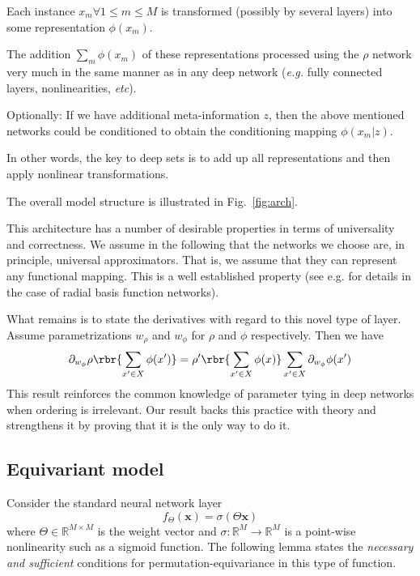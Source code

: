 \documentclass{article}
\newcommand{\reffig}[1]{Fig.~\ref{#1}}
\newcommand{\xx}[0]{\ensuremath{\mathbf{x}}}
\newcommand{\latinphrase}[1]{\emph{#1}}    %
\newcommand{\eg}{\latinphrase{e.g.}\xspace}
\newcommand{\etc}{\latinphrase{etc}\xspace}
\begin{document}
\begin{itemize*}
\item Each instance $x_m \forall 1\leq m \leq M$ is transformed (possibly by several layers) into
  some representation $\phi(x_m)$.
\item The addition $\sum_m \phi(x_m)$ of these representations 
  processed using the $\rho$ network very much in the same manner as in any deep network (\eg
  fully connected layers, nonlinearities, \etc). 
\item Optionally: If we have additional meta-information $z$, then the above mentioned networks could be conditioned to obtain the conditioning mapping $\phi(x_m|z)$. 
\end{itemize*}

In other words, the key to deep sets is to add up all representations and then apply nonlinear transformations. 

The overall model structure is illustrated in \reffig{fig:arch}.

This architecture has a number of desirable properties in terms of universality and correctness. We assume in the following that the networks we choose are, in principle, universal approximators. That is, we assume that they can represent any functional mapping. This is a well established property (see e.g. \cite{Micchelli86b} for details in the case of radial basis function networks).

What remains is to state the derivatives with regard to this novel type of layer. Assume parametrizations $w_\rho$ and $w_\phi$ for $\rho$ and $\phi$ respectively. Then we have
\begin{equation*}
  \partial_{w_\phi} \rho\rbr{\sum_{x' \in X} \phi(x')} = 
  \rho'\rbr{\sum_{x' \in X} \phi(x)} \sum_{x' \in X} \partial_{w_\phi} \phi(x')
\end{equation*}
This result reinforces the common knowledge of parameter tying in deep networks when ordering is irrelevant. Our result backs this practice with theory and strengthens it by proving that it is the only way to do it.

\subsection{Equivariant model}
Consider the standard neural network layer
\begin{equation}\label{eqc:1}
f_{\Theta}(\xx) = \sigma( \Theta \xx)
\end{equation}
where  $\Theta \in \mathbb{R}^{M \times M}$ is the weight vector and $\sigma: \mathbb{R}^M \to \mathbb{R}^{M}$ is a point-wise nonlinearity such as a sigmoid function. The following lemma states the \textit{necessary and sufficient} conditions for permutation-equivariance in this type of function. 
\end{document}

